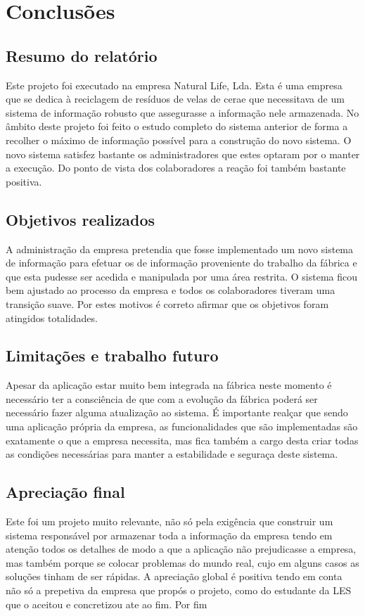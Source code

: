 \chapter{Conclusões}
\label{cap:6}
\section{Resumo do relatório}
Este projeto foi executado na empresa Natural Life, Lda. Esta é uma empresa que se dedica à reciclagem de resíduos de velas de cerae que necessitava de um sistema de informação robusto que assegurasse a informação nele armazenada. No âmbito deste projeto foi feito o estudo completo do sistema anterior de forma a recolher o máximo de informação possível para a construção do novo sistema. O novo sistema satisfez bastante os administradores que estes optaram por o manter a execução. Do ponto de vista dos colaboradores a reação foi também bastante positiva.


\section{Objetivos realizados}
A administração da empresa pretendia que fosse implementado um novo sistema de informação para efetuar os de informação proveniente do trabalho da fábrica e que esta pudesse ser acedida e manipulada por uma área restrita. O sistema ficou bem ajustado ao processo da empresa e todos os colaboradores tiveram uma transição suave. Por estes motivos é correto afirmar que os objetivos foram atingidos totalidades.

\section{Limitações e trabalho futuro}
Apesar da aplicação estar muito bem integrada na fábrica neste momento é necessário ter a consciência de que com a evolução da fábrica poderá ser necessário fazer alguma atualização ao sistema. É importante realçar que sendo uma aplicação própria da empresa, as funcionalidades que são implementadas são exatamente o que a empresa necessita, mas fica também a cargo desta criar todas as condições necessárias para manter a estabilidade e seguraça deste sistema.

\section{Apreciação final}
Este foi um projeto muito relevante, não só pela exigência que construir um sistema responsável por armazenar toda a informação da empresa tendo em atenção todos os detalhes de modo a que a aplicação não prejudicasse a empresa, mas também porque se colocar problemas do mundo real, cujo em alguns casos as soluções tinham de ser rápidas.
A apreciação global é positiva tendo em conta não só a prepetiva da empresa que propós o projeto, como do estudante da LES que o aceitou e concretizou ate ao fim.
Por fim 